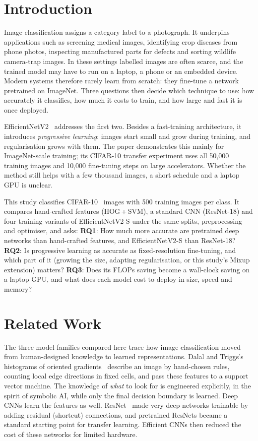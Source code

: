 \documentclass{COMPXXXX}
\begin{document}
\section{Introduction}
Image classification assigns a category label to a photograph. It underpins applications such as
screening medical images, identifying crop diseases from phone photos, inspecting manufactured parts for
defects and sorting wildlife camera-trap images. In these settings labelled images are often scarce, and
the trained model may have to run on a laptop, a phone or an embedded device. Modern systems therefore
rarely learn from scratch: they fine-tune a network pretrained on ImageNet. Three questions then decide
which technique to use: how accurately it classifies, how much it costs to train, and how large and
fast it is once deployed.

EfficientNetV2~\cite{tan2021efficientnetv2} addresses the first two. Besides a fast-training
architecture, it introduces \emph{progressive learning}: images start small and grow during training,
and regularisation grows with them. The paper demonstrates this mainly for ImageNet-scale training; its
CIFAR-10 transfer experiment uses all 50{,}000 training images and 10{,}000 fine-tuning steps on large
accelerators. Whether the method still helps with a few thousand images, a short schedule and a laptop
GPU is unclear.

This study classifies CIFAR-10~\cite{krizhevsky2009learning} images with 500 training images per class.
It compares hand-crafted features (HOG\,+\,SVM), a standard CNN (ResNet-18) and four training variants
of EfficientNetV2-S under the same splits, preprocessing and optimiser, and asks:
\textbf{RQ1}: How much more accurate are pretrained deep networks than hand-crafted features, and
EfficientNetV2-S than ResNet-18?
\textbf{RQ2}: Is progressive learning as accurate as fixed-resolution fine-tuning, and which part of
it (growing the size, adapting regularisation, or this study's Mixup extension) matters?
\textbf{RQ3}: Does its FLOPs saving become a wall-clock saving on a laptop GPU, and what does each
model cost to deploy in size, speed and memory?

\section{Related Work}\label{sec:related}
The three model families compared here trace how image classification moved from human-designed
knowledge to learned representations. Dalal and Triggs's histograms of oriented
gradients~\cite{dalal2005histograms} describe an image by hand-chosen rules, counting local edge
directions in fixed cells, and pass these features to a support vector machine. The knowledge of
\emph{what} to look for is engineered explicitly, in the spirit of symbolic AI, while only the final
decision boundary is learned. Deep CNNs learn the features as well. ResNet~\cite{he2016deep} made very
deep networks trainable by adding residual (shortcut) connections, and pretrained ResNets became a
standard starting point for transfer learning. Efficient CNNs then reduced the cost of these networks
for limited hardware.
\end{document}
